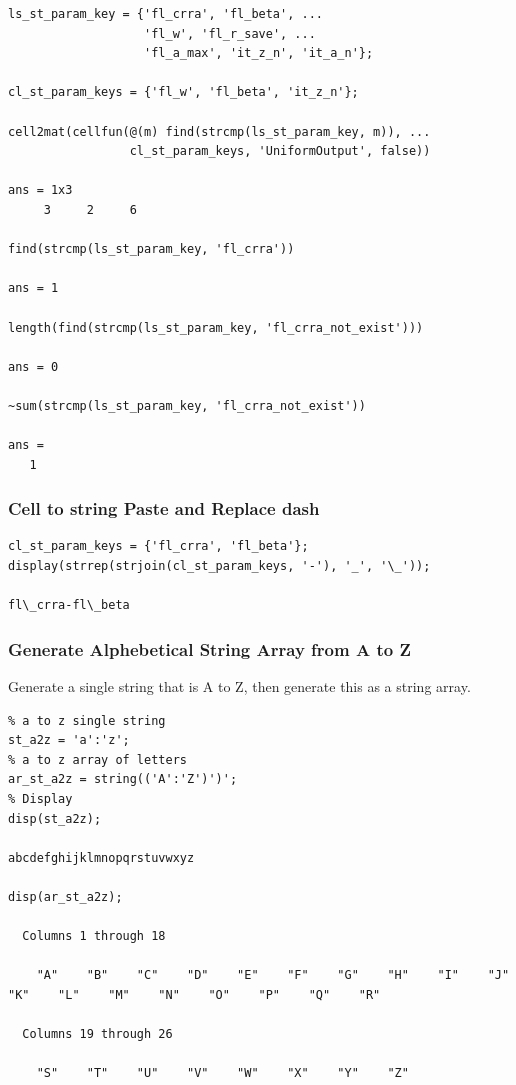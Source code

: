 \documentclass[
]{book}
\begin{document}
\begin{verbatim}
ls_st_param_key = {'fl_crra', 'fl_beta', ...
                   'fl_w', 'fl_r_save', ...
                   'fl_a_max', 'it_z_n', 'it_a_n'};

cl_st_param_keys = {'fl_w', 'fl_beta', 'it_z_n'};

cell2mat(cellfun(@(m) find(strcmp(ls_st_param_key, m)), ...
                 cl_st_param_keys, 'UniformOutput', false))

ans = 1x3    
     3     2     6

find(strcmp(ls_st_param_key, 'fl_crra'))

ans = 1

length(find(strcmp(ls_st_param_key, 'fl_crra_not_exist')))

ans = 0

~sum(strcmp(ls_st_param_key, 'fl_crra_not_exist'))

ans = 
   1
\end{verbatim}

\hypertarget{cell-to-string-paste-and-replace-dash}{%
\subsubsection{Cell to string Paste and Replace dash}\label{cell-to-string-paste-and-replace-dash}}

\begin{verbatim}
cl_st_param_keys = {'fl_crra', 'fl_beta'};
display(strrep(strjoin(cl_st_param_keys, '-'), '_', '\_'));

fl\_crra-fl\_beta
\end{verbatim}

\hypertarget{generate-alphebetical-string-array-from-a-to-z}{%
\subsubsection{Generate Alphebetical String Array from A to Z}\label{generate-alphebetical-string-array-from-a-to-z}}

Generate a single string that is A to Z, then generate this as a string
array.

\begin{verbatim}
% a to z single string
st_a2z = 'a':'z';
% a to z array of letters
ar_st_a2z = string(('A':'Z')')';
% Display
disp(st_a2z);

abcdefghijklmnopqrstuvwxyz

disp(ar_st_a2z);

  Columns 1 through 18

    "A"    "B"    "C"    "D"    "E"    "F"    "G"    "H"    "I"    "J"    "K"    "L"    "M"    "N"    "O"    "P"    "Q"    "R"

  Columns 19 through 26

    "S"    "T"    "U"    "V"    "W"    "X"    "Y"    "Z"
\end{verbatim}
\end{document}
